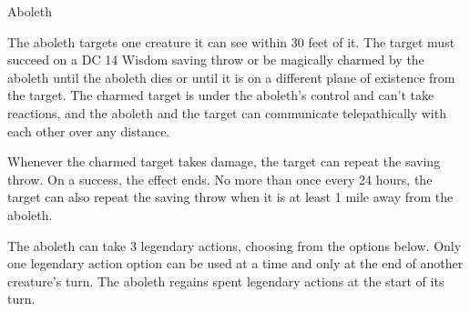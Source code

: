\begin{DndMonster}[width=\textwidth + 8pt]{Aboleth}
\begin{multicols}{2}
     The aboleth targets one creature it can see within 30 feet of it. The target must succeed on a DC 14 Wisdom saving throw or be magically charmed by the aboleth until the aboleth dies or until it is on a different plane of existence from the target. The charmed target is under the aboleth's control and can't take reactions, and the aboleth and the target can communicate telepathically with each other over any distance.

    Whenever the charmed target takes damage, the target can repeat the saving throw. On a success, the effect ends. No more than once every 24 hours, the target can also repeat the saving throw when it is at least 1 mile away from the aboleth.


    The aboleth can take 3 legendary actions, choosing from the options below. Only one legendary action option can be used at a time and only at the end of another creature's turn. The aboleth regains spent legendary actions at the start of its turn.

    \begin{DndMonsterLegendaryActions}
    \end{DndMonsterLegendaryActions}
\end{multicols}
\end{DndMonster}

